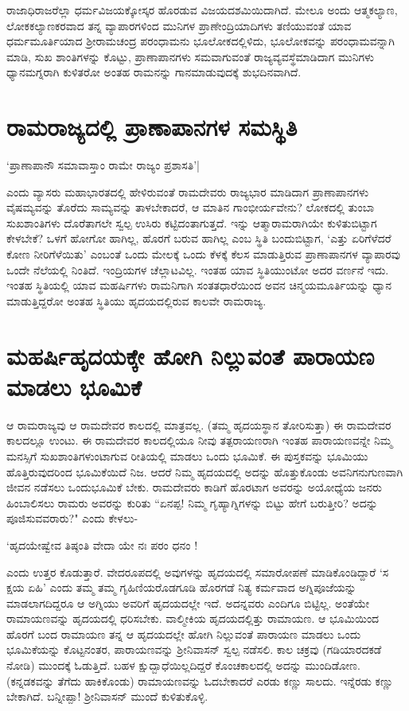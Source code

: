 ರಾಜಾಧಿರಾಜರೆಲ್ಲಾ ಧರ್ಮವಿಜಯಕ್ಕೋಸ್ಕರ ಹೊರಡುವ ವಿಜಯದಶಮಿಯಿದಾಗಿದೆ. ಮೇಲೂ ಅಂದು ಆತ್ಮಕಲ್ಯಾಣ, ಲೋಕಕಲ್ಯಾಣಕರವಾದ ತನ್ನ ವ್ಯಾಪಾರಗಳಿಂದ ಮುನಿಗಳ ಪ್ರಾಣೇಂದ್ರಿಯಾದಿಗಳು ತಣಿಯುವಂತೆ ಯಾವ ಧರ್ಮಮೂರ್ತಿಯಾದ ಶ್ರೀರಾಮಚಂದ್ರ ಪರಂಧಾಮನು ಭೂಲೋಕದಲ್ಲಿಳಿದು, ಭೂಲೋಕವನ್ನು ಪರಂಧಾಮವನ್ನಾಗಿ ಮಾಡಿ, ಸುಖ ಶಾಂತಿಗಳನ್ನು ಕೊಟ್ಟು, ಪ್ರಾಣಾಪಾನಗಳು ಸಮವಾಗುವಂತೆ ರಾಜ್ಯವ್ಯವಸ್ಥೆಮಾಡಿದಾಗ ಮುನಿಗಳು ಧ್ಯಾನಮಗ್ನರಾಗಿ ಕುಳಿತರೋ ಅಂತಹ ರಾಮನನ್ನು ಗಾನಮಾಡುವುದಕ್ಕೆ ಶುಭದಿನವಾಗಿದೆ. 

\section*{ರಾಮರಾಜ್ಯದಲ್ಲಿ ಪ್ರಾಣಾಪಾನಗಳ ಸಮಸ್ಥಿತಿ} 

\begin{shloka} 
`ಪ್ರಾಣಾಪಾನೌ ಸಮಾವಾಸ್ತಾಂ ರಾಮೇ ರಾಜ್ಯಂ ಪ್ರಶಾಸತಿ'|
\end{shloka} 

ಎಂದು ವ್ಯಾಸರು ಮಹಾಭಾರತದಲ್ಲಿ ಹೇಳಿರುವಂತೆ ರಾಮದೇವರು ರಾಜ್ಯಭಾರ ಮಾಡಿದಾಗ ಪ್ರಾಣಾಪಾನಗಳು ವೈಷಮ್ಯವನ್ನು ತೊರೆದು ಸಾಮ್ಯವನ್ನು ತಾಳಬೇಕಾದರೆ, ಆ ಮಾತಿನ ಗಾಂಭೀರ್ಯವೇನು? ಲೋಕದಲ್ಲಿ ತುಂಬಾ ಸುಖಶಾಂತಿಗಳು ದೊರೆತಾಗಲೇ ಸ್ವಲ್ಪ ಉಸಿರು ಕಟ್ಟಿದಂತಾಗುತ್ತದೆ. ಇನ್ನು ಆತ್ಮಾರಾಮರಾಗಿಯೇ ಕುಳಿತುಬಿಟ್ಟಾಗ ಕೇಳಬೇಕೆ? ಒಳಗೆ ಹೋಗೋ ಹಾಗಿಲ್ಲ, ಹೊರಗೆ ಬರುವ ಹಾಗಿಲ್ಲ ಎಂಬ ಸ್ಥಿತಿ ಬಂದುಬಿಟ್ಟಾಗ, `ಎತ್ತು ಏರಿಗೆಳೆದರೆ ಕೋಣ ನೀರಿಗೆಳೆಯಿತು' ಎಂಬಂತೆ ಒಂದು ಮೇಲಕ್ಕೆ ಒಂದು ಕೆಳಕ್ಕೆ ಕೆಲಸ ಮಾಡುತ್ತಿರುವ ಪ್ರಾಣಾಪಾನಗಳ ವ್ಯಾಪಾರವು ಒಂದೇ ನೆಲೆಯಲ್ಲಿ ನಿಂತಿದೆ. ಇಂದ್ರಿಯಗಳ ಚೆಲ್ಲಾಟವಿಲ್ಲ. ಇಂತಹ ಯಾವ ಸ್ಥಿತಿಯುಂಟೋ ಅದರ ವರ್ಣನೆ ಇದು. ಇಂತಹ ಸ್ಥಿತಿಯಲ್ಲಿ ಯಾವ ಮಹರ್ಷಿಗಳು ರಾಮನಿಗಾಗಿ ಸಂತತಧಾರೆಯಿಂದ ಅವನ ಚಿನ್ಮಯಮೂರ್ತಿಯನ್ನು ಧ್ಯಾನ ಮಾಡುತ್ತಿದ್ದರೋ ಅಂತಹ ಸ್ಥಿತಿಯು ಹೃದಯದಲ್ಲಿರುವ ಕಾಲವೇ ರಾಮರಾಜ್ಯ. 

\section*{ಮಹರ್ಷಿಹೃದಯಕ್ಕೇ ಹೋಗಿ ನಿಲ್ಲುವಂತೆ ಪಾರಾಯಣ ಮಾಡಲು ಭೂಮಿಕೆ} 

ಆ ರಾಮರಾಜ್ಯವು ಆ ರಾಮದೇವರ ಕಾಲದಲ್ಲಿ ಮಾತ್ರವಲ್ಲ. (ತಮ್ಮ ಹೃದಯಸ್ಥಾನ ತೋರಿಸುತ್ತಾ) ಈ ರಾಮದೇವರ ಕಾಲದಲ್ಲೂ ಉಂಟು. ಈ ರಾಮದೇವರ ಕಾಲದಲ್ಲಿಯೂ ನೀವು ತತ್ಪರಾಯಣರಾಗಿ ಇಂತಹ ಪಾರಾಯಣವನ್ನೇ ನಿಮ್ಮ ಮನಸ್ಸಿಗೆ ಸುಖಶಾಂತಿಗಳುಂಟಾಗುವ ರೀತಿಯಲ್ಲಿ ಮಾಡಲು ಒಂದು ಭೂಮಿಕೆ. ಈ ಪುಸ್ತಕವನ್ನು ಭೂಮಿಯು ಹೊತ್ತಿರುವುದರಿಂದ ಭೂಮಿಕೆಯಿದೆ ನಿಜ. ಆದರೆ ನಿಮ್ಮ ಹೃದಯದಲ್ಲಿ ಅದನ್ನು ಹೊತ್ತುಕೊಂಡು ಅವನಿಗನುಗುಣವಾಗಿ ಜೀವನ ನಡೆಸಲು ಒಂದುಭೂಮಿಕೆ ಬೇಕು. ರಾಮದೇವರು ಕಾಡಿಗೆ ಹೊರಟಾಗ ಅವರನ್ನು ಅಯೋಧ್ಯೆಯ ಜನರು ಹಿಂಬಾಲಿಸಲು ರಾಮರು ಅವರನ್ನು ಕುರಿತು ``ಏನಪ್ಪ! ನಿಮ್ಮ ಗೃಹ್ಯಾಗ್ನಿಗಳನ್ನು ಬಿಟ್ಟು ಹೇಗೆ ಬರುತ್ತೀರಿ? ಅದನ್ನು ಪೂಜಿಸುವವರಾರು?" ಎಂದು ಕೇಳಲು- 

\begin{shloka} 
`ಹೃದಯೇಷ್ವೇವ ತಿಷ್ಠಂತಿ ವೇದಾ ಯೇ ನಃ ಪರಂ ಧನಂ !
\end{shloka} 

ಎಂದು ಉತ್ತರ ಕೊಡುತ್ತಾರೆ. ವೇದರೂಪದಲ್ಲಿ ಅವುಗಳನ್ನು ಹೃದಯದಲ್ಲಿ ಸಮಾರೋಪಣೆ ಮಾಡಿಕೊಂಡಿದ್ದಾರೆ `ಸ ಕ್ಷಯ ಏಹಿ' ಎಂದು ತಮ್ಮ ತಮ್ಮ ಗೃಹಿಣಿಯರೊಡಗೂಡಿ ಹೊರಗಡೆ ನಿತ್ಯ ಕರ್ಮವಾದ ಅಗ್ನಿಪೂಜೆಯನ್ನು ಮಾಡಲಾಗದಿದ್ದರೂ ಆ ಅಗ್ನಿಯು ಅವರಿಗೆ ಹೃದಯದಲ್ಲೇ ಇದೆ. ಅದನ್ನವರು ಎಂದಿಗೂ ಬಿಟ್ಟಿಲ್ಲ. ಅಂತೆಯೇ ರಾಮಾಯಣವನ್ನು ಹೃದಯದಲ್ಲಿ ಧರಿಸಬೇಕು. ವಾಲ್ಮೀಕಿಯ ಹೃದಯದಲ್ಲಿತ್ತು ರಾಮಾಯಣ. ಆ ಭೂಮಿಯಿಂದ ಹೊರಗೆ ಬಂದ ರಾಮಾಯಣ ತನ್ನ ಆ ಹೃದಯದಲ್ಲೇ ಹೋಗಿ ನಿಲ್ಲುವಂತೆ ಪಾರಾಯಣ ಮಾಡಲು ಒಂದು ಭೂಮಿಕೆಯನ್ನು ಕೊಟ್ಟನಂತರ, ಪಾರಾಯಣವನ್ನು ಶ್ರೀನಿವಾಸನ್‍ ಸ್ವಲ್ಪ ನಡೆಸಲಿ. ಕಾಲ ಚಕ್ರವು (ಗಡಿಯಾರದಕಡೆ ನೋಡಿ) ಮುಂದಕ್ಕೆ ಓಡುತ್ತಿದೆ. ಬಹಳ ಕ್ಷುದ್ಬಾಧೆಯಿಲ್ಲದಿದ್ದರೆ ಕೊಂಚಕಾಲದಲ್ಲಿ ಅದನ್ನು ಮುಂದಿಡೋಣ. (ಕನ್ನಡಕವನ್ನು ತೆಗೆದು ಹಾಕಿಕೊಂಡು) ರಾಮಾಯಣವನ್ನು ಓದಬೇಕಾದರೆ ಎರಡು ಕಣ್ಣು ಸಾಲದು. ಇನ್ನೆರಡು ಕಣ್ಣು ಬೇಕಾಗಿದೆ. ಬನ್ನೀಪ್ಪಾ! ಶ್ರೀನಿವಾಸನ್‍ ಮುಂದೆ ಕುಳಿತುಕೊಳ್ಳಿ. 

